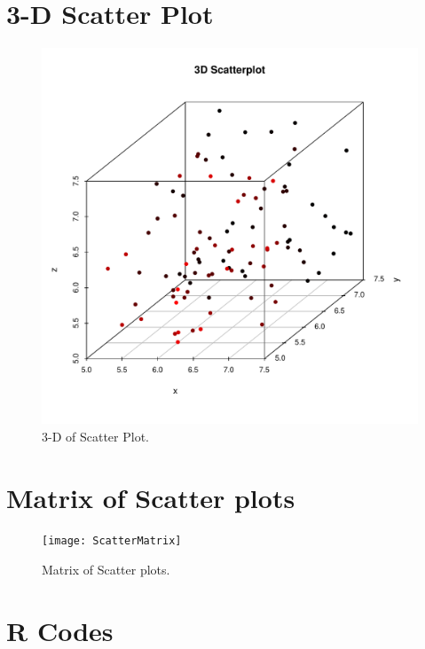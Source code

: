 \documentclass[11pt]{amsart}
\begin{document}
 \section*{\bf{3-D Scatter Plot }}
 \begin{figure}[H]
\centering
 \includegraphics[scale=0.7]{scatter3D}%
  \caption{3-D of Scatter Plot. }
\label{fig:ScatterMat}
\end{figure} 
\newpage

\section*{\bf{Matrix of Scatter plots}}

\begin{figure}[H]
\centering
 \texttt{[image: ScatterMatrix]}%
  \caption{Matrix of Scatter plots. }
\label{fig:ScatterMat}
\end{figure} 

\appendix

\section{R Codes \label{Rcodes}}
 



\end{document}
